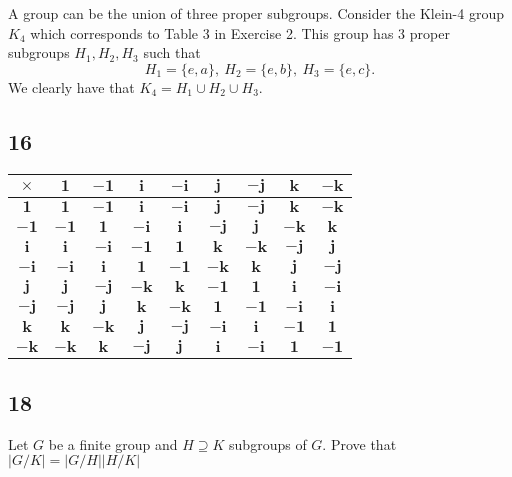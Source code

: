 \documentclass{article}
\begin{document}
A group can be the union of three proper subgroups. Consider the Klein-4 group $K_4$ which
corresponds to Table 3 in Exercise 2. This group has 3 proper subgroups $H_1, H_2, H_3$
such that
\begin{equation*}
    H_1 = \{e, a\}, \ H_2 = \{e,b\}, \ H_3 = \{e,c\}.
\end{equation*}
We clearly have that $K_4 = H_1 \cup H_2 \cup H_3$.


\subsection*{16}
\begin{center}
    \begin{tabular}{c | c c c c c c c c}
        $\times$  & $\bm{1}$  & $\bm{-1}$ & $\bm{i}$  & $\bm{-i}$ & $\bm{j}$  & $\bm{-j}$ & $\bm{k}$  & $\bm{-k}$ \\
        \hline
        $\bm{1}$  & $\bm{1}$  & $\bm{-1}$ & $\bm{i}$  & $\bm{-i}$ & $\bm{j}$  & $\bm{-j}$ & $\bm{k}$  & $\bm{-k}$ \\
        $\bm{-1}$ & $\bm{-1}$ & $\bm{1}$  & $\bm{-i}$ & $\bm{i}$  & $\bm{-j}$ & $\bm{j}$  & $\bm{-k}$ & $\bm{k}$  \\
        $\bm{i}$  & $\bm{i}$  & $\bm{-i}$ & $\bm{-1}$ & $\bm{1}$  & $\bm{k}$  & $\bm{-k}$ & $\bm{-j}$ & $\bm{j}$  \\
        $\bm{-i}$ & $\bm{-i}$ & $\bm{i}$  & $\bm{1}$  & $\bm{-1}$ & $\bm{-k}$ & $\bm{k}$  & $\bm{j}$  & $\bm{-j}$ \\
        $\bm{j}$  & $\bm{j}$  & $\bm{-j}$ & $\bm{-k}$ & $\bm{k}$  & $\bm{-1}$ & $\bm{1}$  & $\bm{i}$  & $\bm{-i}$ \\
        $\bm{-j}$ & $\bm{-j}$ & $\bm{j}$  & $\bm{k}$  & $\bm{-k}$ & $\bm{1}$  & $\bm{-1}$ & $\bm{-i}$ & $\bm{i}$  \\
        $\bm{k}$  & $\bm{k}$  & $\bm{-k}$ & $\bm{j}$  & $\bm{-j}$ & $\bm{-i}$ & $\bm{i}$  & $\bm{-1}$ & $\bm{1}$  \\
        $\bm{-k}$ & $\bm{-k}$ & $\bm{k}$  & $\bm{-j}$ & $\bm{j}$  & $\bm{i}$  & $\bm{-i}$ & $\bm{1}$  & $\bm{-1}$ \\
    \end{tabular}
\end{center}


\subsection*{18}
Let $G$ be a finite group and $H \supseteq K$ subgroups of $G$. Prove that
$|G / K| = |G / H||H/K|$
\end{document}
